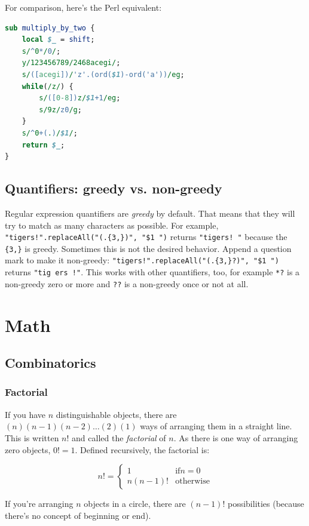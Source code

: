 \documentclass[a4paper,12pt]{article}
\begin{document}
\noindent For comparison, here's the Perl equivalent:
\begin{lstlisting}[language=Perl]
sub multiply_by_two {
	local $_ = shift;
	s/^0*/0/;
	y/123456789/2468acegi/;
	s/([acegi])/'z'.(ord($1)-ord('a'))/eg;
	while(/z/) {
		s/([0-8])z/$1+1/eg;
		s/9z/z0/g;
	}
	s/^0+(.)/$1/;
	return $_;
}
\end{lstlisting}

\subsection{Quantifiers: greedy vs. non-greedy}
Regular expression quantifiers are {\em greedy} by default. That means that they will try to match as many characters as possible. For example, \verb/"tigers!".replaceAll("(.{3,})", "$1 ")/ returns \verb/"tigers! "/ because the \verb/{3,}/ is greedy. Sometimes this is not the desired behavior. Append a question mark to make it non-greedy: \verb/"tigers!".replaceAll("(.{3,}?)", "$1 ")/ returns \verb/"tig ers !"/. This works with other quantifiers, too, for example \verb/*?/ is a non-greedy zero or more and \verb/??/ is a non-greedy once or not at all.

\newpage\section{Math}

\subsection{Combinatorics}

\subsubsection{Factorial}

If you have $n$ distinguishable objects, there are $(n)(n-1)(n-2)\ldots(2)(1)$ ways of arranging them in a straight line. This is written $n!$ and called the {\em factorial} of $n$. As there is one way of arranging zero objects, $0! = 1$. Defined recursively, the factorial is:

\[n! = \begin{cases}1 & \mathrm{if }n=0 \\ n(n-1)! & \mathrm{otherwise}\end{cases}\]

If you're arranging $n$ objects in a circle, there are $(n-1)!$ possibilities (because there's no concept of beginning or end).
\end{document}
